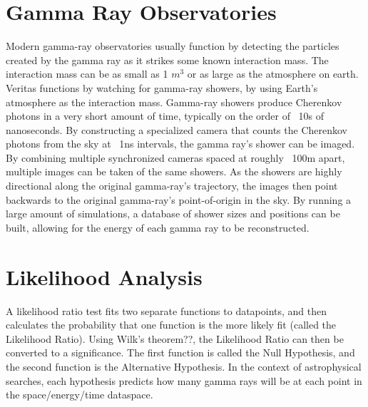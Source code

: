 \section{Gamma Ray Observatories}
Modern gamma-ray observatories usually function by detecting the particles created by the gamma ray as it strikes some known interaction mass.
The interaction mass can be as small as 1 $m^3$ or as large as the atmosphere on earth.
Veritas functions by watching for gamma-ray showers, by using Earth's atmosphere as the interaction mass.
Gamma-ray showers produce Cherenkov photons in a very short amount of time, typically on the order of ~10s of nanoseconds.
By constructing a specialized camera that counts the Cherenkov photons from the sky at ~1ns intervals, the gamma ray's shower can be imaged.
By combining multiple synchronized cameras spaced at roughly ~100m apart, multiple images can be taken of the same showers.
As the showers are highly directional along the original gamma-ray's trajectory, the images then point backwards to the original gamma-ray's point-of-origin in the sky.
By running a large amount of simulations, a database of shower sizes and positions can be built, allowing for the energy of each gamma ray to be reconstructed.

\section{Likelihood Analysis}

A likelihood ratio test fits two separate functions to datapoints, and then calculates the probability that one function is the more likely fit (called the Likelihood Ratio).
Using Wilk's theorem??, the Likelihood Ratio can then be converted to a significance.
The first function is called the Null Hypothesis, and the second function is the Alternative Hypothesis.
In the context of astrophysical searches, each hypothesis predicts how many gamma rays will be at each point in the space/energy/time dataspace.

